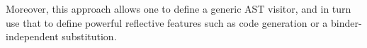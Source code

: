 \documentclass{article}
\begin{document}
\medskip
\noindent Moreover, this approach allows one to define a generic AST visitor, and in turn use that to define powerful reflective features such as code generation or a binder-independent substitution.  





\end{document}
